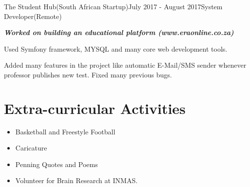 \documentclass[letterpaper]{twentysecondcv} %
\begin{document}

\begin{rSubsection}{The Student Hub(South African Startup)}{July 2017 - August 2017}{System Developer(Remote)}{}
	\item {\em \bf Worked on building an educational platform (www.eraonline.co.za)}
	\item Used Symfony framework, MYSQL and many core web development tools.
	\item Added many features in the project like automatic E-Mail/SMS sender
	whenever professor publishes new test. Fixed many previous bugs.
\end{rSubsection}

\section{Extra-curricular Activities}
\begin{itemize}
	\item Basketball and Freestyle Football
	\item Caricature
	\item Penning Quotes and Poems
	\item Volunteer for Brain Research at INMAS.
\end{itemize}
\end{document}

